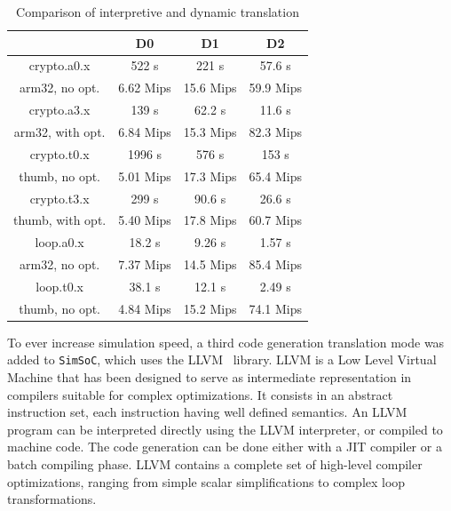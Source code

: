 \documentclass{llncs}
\newcommand{\simsoc}{\texttt{SimSoC}\xspace}
\begin{document}
\begin{table}[tbhp]
\caption{Comparison of interpretive and dynamic translation}
\label{tab:dynamic-translation}
\centering
\begin{tabular}{|c|c|c|c|}\cline{2-4}
\multicolumn{1}{c|}{}        & D0 & D1 & D2 \\ \hline
crypto.a0.x  & 522 s & 221 s & 57.6 s \\
arm32, no opt. & 6.62 Mips & 15.6 Mips &  59.9 Mips \\ \hline
crypto.a3.x  & 139 s & 62.2 s & 11.6 s \\
arm32, with opt. & 6.84 Mips & 15.3 Mips & 82.3 Mips \\ \hline
crypto.t0.x & 1996 s & 576 s & 153 s \\
thumb, no opt. & 5.01 Mips & 17.3 Mips & 65.4 Mips \\ \hline
crypto.t3.x & 299 s & 90.6 s & 26.6 s \\
thumb, with opt. & 5.40 Mips & 17.8 Mips & 60.7 Mips \\ \hline
loop.a0.x   & 18.2 s & 9.26 s & 1.57 s \\
arm32, no opt. & 7.37 Mips & 14.5 Mips & 85.4 Mips\\ \hline
loop.t0.x  & 38.1 s & 12.1 s & 2.49 s \\
thumb, no opt. & 4.84 Mips & 15.2 Mips & 74.1 Mips \\ \hline
\end{tabular}
\end{table}

To ever increase simulation speed, a third code generation translation
mode was added to \simsoc, which uses the LLVM~\cite{llvm-2004}
library. LLVM is a Low Level Virtual Machine that has been designed to
serve as intermediate representation in compilers suitable for complex
optimizations. It consists in an abstract instruction set, each
instruction having well defined semantics. An LLVM program can be
interpreted directly using the LLVM interpreter, or compiled to
machine code. The code generation can be done either with a JIT
compiler or a batch compiling phase. LLVM contains a complete set of
high-level compiler optimizations, ranging from simple scalar
simplifications to complex loop transformations.
\end{document}
